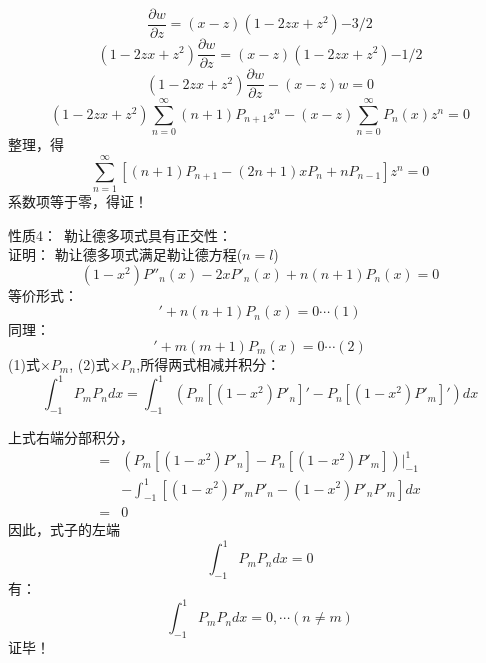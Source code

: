 \begin{frame}
	\begin{equation*}
		\frac{\partial w}{\partial z}=	(x-z)(1-2zx+z^2){-3/2}
	\end{equation*}		
	\begin{equation*}
		(1-2zx+z^2)\frac{\partial w}{\partial z}=(x-z)(1-2zx+z^2){-1/2}
	\end{equation*}		
	\begin{equation*}
		(1-2zx+z^2)\frac{\partial w}{\partial z}-(x-z)w=0
	\end{equation*}		
	\begin{equation*}
		(1-2zx+z^2)\sum_{n=0}^{\infty}(n+1) P_{n+1} z^{n}-(x-z)\sum_{n=0}^{\infty} P_{n}(x) z^{n}=0
	\end{equation*}		
	整理，得
	\begin{equation*}
		\sum_{n=1}^{\infty} [(n+1)P_{n+1} -(2n+1)x P_n + nP_{n-1} ] z^{n}=0
	\end{equation*}		
	系数项等于零，\alert{得证！}   	  
\end{frame}	

\begin{frame}
	\alert{性质4：}~勒让德多项式具有正交性：\\
	\alert{证明：}  勒让德多项式满足勒让德方程($n=l$)
	\begin{equation*}
		\left(1-x^{2}\right) P'' _n  (x) -2 x P' _n (x)+n(n+1)P_n(x)=0
	\end{equation*}		
	等价形式：
	\begin{equation*}
		[\left(1-x^{2}\right) P' _n  (x)]' +n(n+1)P_n(x)=0    \cdots  (1)
	\end{equation*}		
	同理：
	\begin{equation*}
		[\left(1-x^{2}\right) P' _m  (x)]' + m (m+1)P_m(x)=0    \cdots  (2)
	\end{equation*}		
	(1)式$\times P_m$, (2)式$\times P_n$,所得两式相减并积分： 
	{\small \begin{equation*}
			[n(n+1) -m (m+1)]\int_{-1}^{1} P_mP_n dx =\int_{-1}^{1} (P_m [\left(1-x^{2}\right) P' _n] '- P_n [\left(1-x^{2}\right) P' _m ]')dx
	\end{equation*}		}
\end{frame}	

\begin{frame}
	上式右端分部积分，
	\begin{equation*}
	\begin{split}
		= &(P_m [\left(1-x^{2}\right) P' _n] - P_n [\left(1-x^{2}\right) P' _m ])|_{-1} ^{1} \\ 
		&-\int_{-1}^{1}  [\left(1-x^{2}\right) P' _mP' _n -\left(1-x^{2}\right) P' _nP' _m  ]  dx \\
		=&0
	\end{split}
	\end{equation*}		
	因此，式子的左端
	\begin{equation*}
		[n(n+1) -m (m+1)]\int_{-1}^{1} P_mP_n dx =0
	\end{equation*}	
	有：
	\begin{equation*}
		\int_{-1}^{1} P_mP_n dx =0 ,\cdots (n\ne m)
	\end{equation*}	
	\alert{证毕！} 
\end{frame}	

